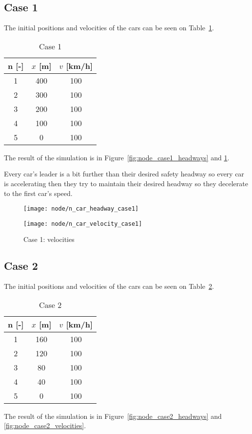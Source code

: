 		\subsection*{Case 1}
		The initial positions and velocities of the cars can be seen on Table~\ref{tab:node_case1}.
		\begin{table}
			\centering
			\begin{tabular}{ |c|c|c| }
				\hline
				n [-] & $x$ [m] & $v$ [km/h]\\
				\hline
				1 & 400 & 100 \\
				2 & 300 & 100 \\
				3 & 200 & 100 \\
				4 & 100 & 100 \\
				5 & 0 & 100 \\
				\hline
			\end{tabular}
			\caption{Case 1}
			\label{tab:node_case1}
		\end{table}
		The result of the simulation is in Figure~\ref{fig:node_case1_headways} and \ref{fig:node_case1_velocities}. 

		Every car's leader is a bit further than their desired safety headway so every car is accelerating then they try to maintain their desired headway so they decelerate to the first car's speed.
		\begin{figure}
			\centering
			\begin{minipage}{.5\textwidth}
				\centering
				\texttt{[image: node/n\_car\_headway\_case1]}
				\caption{Case 1: headways}
				\label{fig:node_case1_headways}
			\end{minipage}\hfill
			\begin{minipage}{.5\textwidth}
				\centering
				\texttt{[image: node/n\_car\_velocity\_case1]}
				\caption{Case 1: velocities}
				\label{fig:node_case1_velocities}
			\end{minipage}
		\end{figure}
		\subsection*{Case 2}
		The initial positions and velocities of the cars can be seen on Table~\ref{tab:node_case2}.
		\begin{table}
			\centering
			\begin{tabular}{ |c|c|c| }
				\hline
				n [-] & $x$ [m] & $v$ [km/h]\\
				\hline
				1 & 160 & 100 \\
				2 & 120 & 100 \\
				3 & 80 & 100 \\
				4 & 40 & 100 \\
				5 & 0 & 100 \\
				\hline
			\end{tabular}
			\caption{Case 2}
			\label{tab:node_case2}
		\end{table}
		The result of the simulation is in Figure~\ref{fig:node_case2_headways} and \ref{fig:node_case2_velocities}. 

